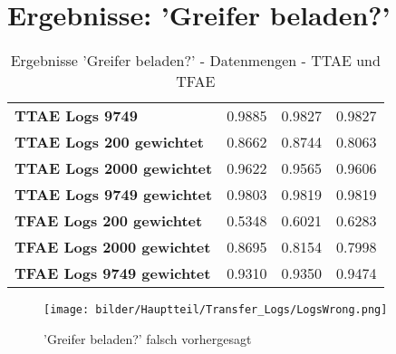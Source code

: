 \chapter{Ergebnisse: 'Greifer beladen?'}
\label{appendix:BaumstammImGreifer}

	
	\begin{table}[ht]
	\centering
	\begin{tabularx}{\textwidth}{llll}
		\rowcolor{Gray}	\textbf{TTAE Logs 9749} 			& 0.9885 & 0.9827 & 0.9827	\\ 
		\textbf{TTAE Logs 200 gewichtet}	& 0.8662 & 0.8744 & 0.8063 	\\		
		\textbf{TTAE Logs 2000 gewichtet}	& 0.9622 & 0.9565 & 0.9606  \\	
		\textbf{TTAE Logs 9749 gewichtet}	& 0.9803 & 0.9819 & 0.9819	\\	
		\textbf{TFAE Logs 200 gewichtet}	 	    & 0.5348 & 0.6021 & 0.6283 	\\		
		\textbf{TFAE Logs 2000 gewichtet}	 	    & 0.8695 & 0.8154 & 0.7998 	\\	
		\textbf{TFAE Logs 9749 gewichtet}	 	    & 0.9310 & 0.9350 & 0.9474  \\	
	\end{tabularx}
	\caption{Ergebnisse 'Greifer beladen?' - Datenmengen - TTAE und TFAE}
	\label{table:Ergebnisse_Transfer_Logs}
\end{table}


\begin{figure}[h]
	\centering
	\texttt{[image: bilder/Hauptteil/Transfer\_Logs/LogsWrong.png]}
	\caption{'Greifer beladen?' falsch vorhergesagt}
	\label{img:LogsFalschVorhergesagt}
\end{figure}